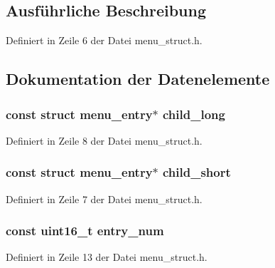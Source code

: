 \subsection{Ausführliche Beschreibung}


Definiert in Zeile 6 der Datei menu\+\_\+struct.\+h.



\subsection{Dokumentation der Datenelemente}
\hypertarget{structmenu__entry_a79da8f2d51ac63708f7f8f41b56d0102}{}
\subsubsection[{child\+\_\+long}]{\setlength{\rightskip}{0pt plus 5cm}const struct {\bf menu\+\_\+entry}$\ast$ child\+\_\+long}\label{structmenu__entry_a79da8f2d51ac63708f7f8f41b56d0102}


Definiert in Zeile 8 der Datei menu\+\_\+struct.\+h.

\hypertarget{structmenu__entry_a759c31dc71a94a9bbafdc849d2db5c1a}{}
\subsubsection[{child\+\_\+short}]{\setlength{\rightskip}{0pt plus 5cm}const struct {\bf menu\+\_\+entry}$\ast$ child\+\_\+short}\label{structmenu__entry_a759c31dc71a94a9bbafdc849d2db5c1a}


Definiert in Zeile 7 der Datei menu\+\_\+struct.\+h.

\hypertarget{structmenu__entry_aead51ebe631627145d52a84b2d92e240}{}
\subsubsection[{entry\+\_\+num}]{\setlength{\rightskip}{0pt plus 5cm}const uint16\+\_\+t entry\+\_\+num}\label{structmenu__entry_aead51ebe631627145d52a84b2d92e240}


Definiert in Zeile 13 der Datei menu\+\_\+struct.\+h.

